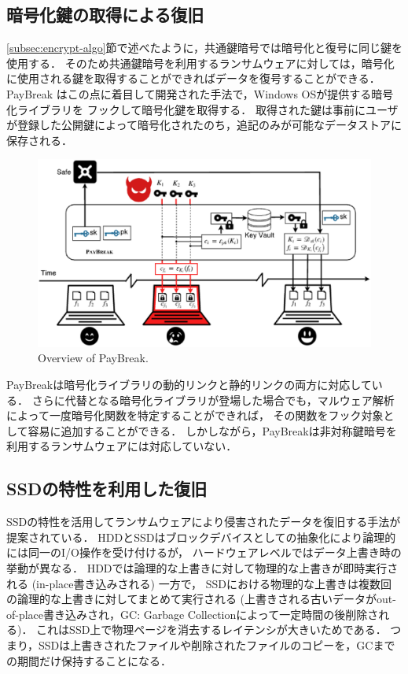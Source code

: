 \subsection{暗号化鍵の取得による復旧}
\ref{subsec:encrypt-algo}節で述べたように，共通鍵暗号では暗号化と復号に同じ鍵を使用する．
そのため共通鍵暗号を利用するランサムウェアに対しては，暗号化に使用される鍵を取得することができればデータを復号することができる．
PayBreak \cite{kolodenker2017paybreak} はこの点に着目して開発された手法で，Windows OSが提供する暗号化ライブラリを
フックして暗号化鍵を取得する．
取得された鍵は事前にユーザが登録した公開鍵によって暗号化されたのち，追記のみが可能なデータストアに保存される．
\begin{figure}[t]
  \begin{center}
    \includegraphics[width=\columnwidth]{doc/img/paybreak-overview.eps}
  \end{center}
  \caption{Overview of PayBreak. \cite{kolodenker2017paybreak}}
  \label{fig:paybreak-overview}
\end{figure}
PayBreakは暗号化ライブラリの動的リンクと静的リンクの両方に対応している．
さらに代替となる暗号化ライブラリが登場した場合でも，マルウェア解析によって一度暗号化関数を特定することができれば，
その関数をフック対象として容易に追加することができる．
しかしながら，PayBreakは非対称鍵暗号を利用するランサムウェアには対応していない．

\subsection{SSDの特性を利用した復旧}
\label{subsec:ssd-recovery}
SSDの特性を活用してランサムウェアにより侵害されたデータを復旧する手法が提案されている．
HDDとSSDはブロックデバイスとしての抽象化により論理的には同一のI/O操作を受け付けるが，
ハードウェアレベルではデータ上書き時の挙動が異なる．
HDDでは論理的な上書きに対して物理的な上書きが即時実行される (in-place書き込みされる) 一方で，
SSDにおける物理的な上書きは複数回の論理的な上書きに対してまとめて実行される
(上書きされる古いデータがout-of-place書き込みされ，GC: Garbage Collectionによって一定時間の後削除される)．
これはSSD上で物理ページを消去するレイテンシが大きいためである．
つまり，SSDは上書きされたファイルや削除されたファイルのコピーを，GCまでの期間だけ保持することになる．


